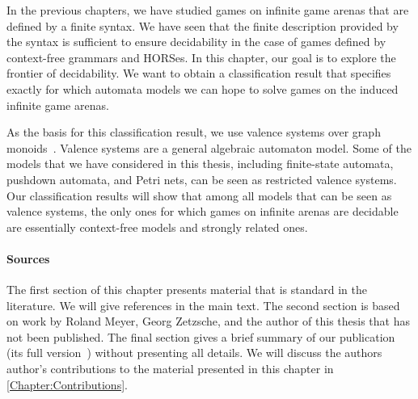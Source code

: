 \documentclass[../../diss.tex]{subfiles}
\begin{document}
In the previous chapters, we have studied games on infinite game arenas that are defined by a finite syntax.
We have seen that the finite description provided by the syntax is sufficient to ensure decidability in the case of games defined by context-free grammars and HORSes.
In this chapter, our goal is to explore the frontier of decidability.
We want to obtain a classification result that specifies exactly for which automata models we can hope to solve games on the induced infinite game arenas.

As the basis for this classification result, we use valence systems over graph monoids~\cite{Zetzsche15d}.
Valence systems are a general algebraic automaton model.
Some of the models that we have considered in this thesis, including finite-state automata, pushdown automata, and Petri nets, can be seen as restricted valence systems.
Our classification results will show that among all models that can be seen as valence systems, the only ones for which games on infinite arenas are decidable are essentially context-free models and strongly related ones.

\paragraph{Sources}

The first section of this chapter presents material that is standard in the literature.
We will give references in the main text.
The second section is based on work by Roland Meyer, Georg Zetzsche, and the author of this thesis that has not been published.
The final section gives a brief summary of our publication~\cite{MeyerMZ18} (\resp its full version~\cite{MeyerMZ18a}) without presenting all details.
We will discuss the authors author's contributions to the material presented in this chapter in \cref{Chapter:Contributions}.
\end{document}

